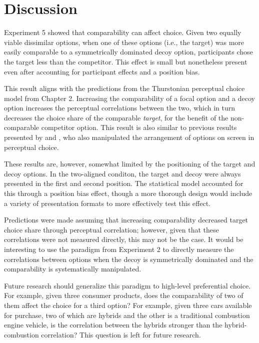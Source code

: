 \section{Discussion}

Experiment 5 showed that comparability can affect choice. Given two equally viable dissimilar options, when one of these options (i.e., the target) was more easily comparable to a symmetrically dominated decoy option, participants chose the target less than the competitor. This effect is small but nonetheless present even after accounting for participant effects and a position bias.

This result aligns with the predictions from the Thurstonian perceptual choice model from Chapter 2. Increasing the comparability of a focal option and a decoy option increases the perceptual correlations between the two, which in turn decreases the choice share of the comparable \textit{target}, for the benefit of the non-comparable competitor option. This result is also similar to previous results presented by \textcite{trueblood2022attentional} and \textcite{evansImpactPresentationOrder2021}, who also manipulated the arrangement of options on screen in perceptual choice.

These results are, however, somewhat limited by the positioning of the target and decoy options. In the two-aligned conditon, the target and decoy were always presented in the first and second position. The statistical model accounted for this through a position bias effect, though a more thorough design would include a variety of presentation formats to more effectively test this effect.

Predictions were made assuming that increasing comparability decreased target choice share through perceptual correlation; however, given that these correlations were not measured directly, this may not be the case. It would be interesting to use the paradigm from Experiment 2 to directly measure the correlations between options when the decoy is symmetrically dominated and the comparability is systematically manipulated.

Future research should generalize this paradigm to high-level preferential choice. For example, given three consumer products, does the comparability of two of them affect the choice for a third option? For example, given three cars available for purchase, two of which are hybrids and the other is a traditional combustion engine vehicle, is the correlation between the hybrids stronger than the hybrid-combustion correlation? This question is left for future research.

